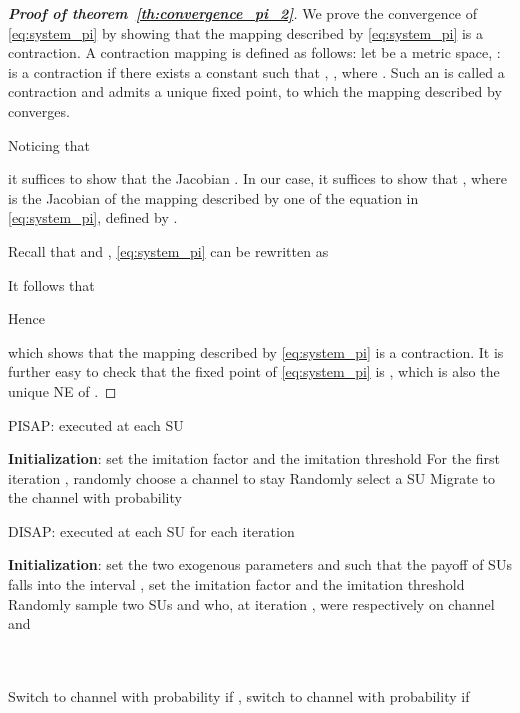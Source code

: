 \documentclass[12pt, onecolumn]{IEEEtran}
\theoremstyle{plain}
\theoremstyle{definition}
\begin{document}
\begin{proof}[\textbf{Proof of theorem~\ref{th:convergence_pi_2}}]

We prove the convergence of \eqref{eq:system_pi} by showing that the mapping described by \eqref{eq:system_pi} is a contraction. A contraction mapping is defined \cite{Abraham88} as follows: let
 be a metric space, :  is a contraction
if there exists a constant  such that , , where . Such an  is called a contraction and admits a unique fixed point, to which the mapping described by  converges.

Noticing that

it suffices to show that the Jacobian . In our case, it suffices to show that , where
 is the Jacobian of the mapping described by one of the equation in \eqref{eq:system_pi}, defined by
.

Recall that  and , \eqref{eq:system_pi} can be rewritten as


It follows that
\vspace{-0.5cm}


Hence
\vspace{-0.5cm}

which shows that the mapping described by \eqref{eq:system_pi} is a contraction. It is further easy to check that the fixed point of \eqref{eq:system_pi} is , which is also the unique NE of .
\end{proof}


\newpage

\begin{algorithm}
\caption{PISAP: executed at each SU }
\begin{algorithmic}[1]
\STATE \textbf{Initialization}: set the imitation factor  and the imitation threshold 
\STATE For the first iteration , randomly choose a channel to stay
    \STATE Randomly select a SU 
    \IF{}
        \STATE Migrate to the channel  with probability 
    \ENDIF
\ENDWHILE
\end{algorithmic}
\label{algo:pir}
\end{algorithm}

\begin{algorithm}
\caption{DISAP: executed at each SU  for each iteration}
\begin{algorithmic}[1]
\STATE \textbf{Initialization}: set the two exogenous parameters  and  such that the payoff of SUs falls into the interval , set the imitation factor  and the imitation threshold 
\STATE Randomly sample two SUs  and  who, at iteration , were respectively on channel  and 
\IF{}
\STATE   \hfill \phantom{.}







\ELSIF{}
\STATE \\

\ELSE
\STATE \\

\ENDIF
\STATE Switch to channel  with probability  if , switch to channel  with probability  if 
\end{algorithmic}
\label{algo:apir}
\end{algorithm}
\end{document}
